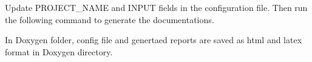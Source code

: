 \begin{DoxyCode}{0}
\end{DoxyCode}
 Update P\+R\+O\+J\+E\+C\+T\+\_\+\+N\+A\+ME and I\+N\+P\+UT fields in the configuration file. Then run the following command to generate the documentations. 
\begin{DoxyCode}{0}
\end{DoxyCode}
 In Doxygen folder, config file and genertaed reports are saved as html and latex format in Doxygen directory. 